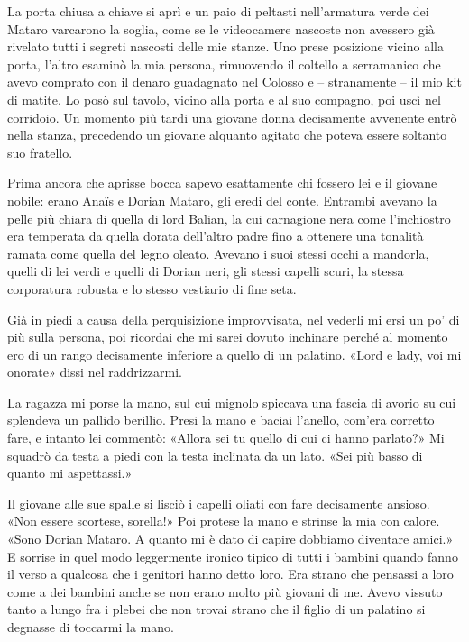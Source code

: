 La porta chiusa a chiave si aprì e un paio di peltasti nell'armatura
verde dei Mataro varcarono la soglia, come se le videocamere nascoste
non avessero già rivelato tutti i segreti nascosti delle mie stanze. Uno
prese posizione vicino alla porta, l'altro esaminò la mia persona,
rimuovendo il coltello a serramanico che avevo comprato con il denaro
guadagnato nel Colosso e -- stranamente -- il mio kit di matite. Lo posò
sul tavolo, vicino alla porta e al suo compagno, poi uscì nel corridoio.
Un momento più tardi una giovane donna decisamente avvenente entrò nella
stanza, precedendo un giovane alquanto agitato che poteva essere
soltanto suo fratello.

Prima ancora che aprisse bocca sapevo esattamente chi fossero lei e il
giovane nobile: erano Anaïs e Dorian Mataro, gli eredi del conte.
Entrambi avevano la pelle più chiara di quella di lord Balian, la cui
carnagione nera come l'inchiostro era temperata da quella dorata
dell'altro padre fino a ottenere una tonalità ramata come quella del
legno oleato. Avevano i suoi stessi occhi a mandorla, quelli di lei
verdi e quelli di Dorian neri, gli stessi capelli scuri, la stessa
corporatura robusta e lo stesso vestiario di fine seta.

Già in piedi a causa della perquisizione improvvisata, nel vederli mi
ersi un po' di più sulla persona, poi ricordai che mi sarei dovuto
inchinare perché al momento ero di un rango decisamente inferiore a
quello di un palatino. «Lord e lady, voi mi onorate» dissi nel
raddrizzarmi.

La ragazza mi porse la mano, sul cui mignolo spiccava una fascia di
avorio su cui splendeva un pallido berillio. Presi la mano e baciai
l'anello, com'era corretto fare, e intanto lei commentò: «Allora sei tu
quello di cui ci hanno parlato?» Mi squadrò da testa a piedi con la
testa inclinata da un lato. «Sei più basso di quanto mi aspettassi.»

Il giovane alle sue spalle si lisciò i capelli oliati con fare
decisamente ansioso. «Non essere scortese, sorella!» Poi protese la mano
e strinse la mia con calore. «Sono Dorian Mataro. A quanto mi è dato di
capire dobbiamo diventare amici.» E sorrise in quel modo leggermente
ironico tipico di tutti i bambini quando fanno il verso a qualcosa che i
genitori hanno detto loro. Era strano che pensassi a loro come a dei
bambini anche se non erano molto più giovani di me. Avevo vissuto tanto
a lungo fra i plebei che non trovai strano che il figlio di un palatino
si degnasse di toccarmi la mano.

